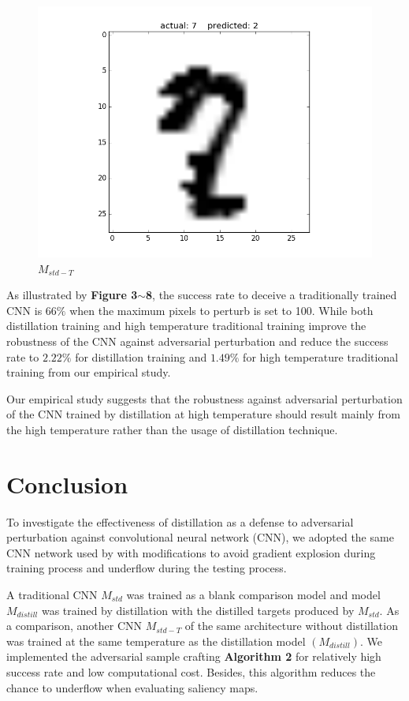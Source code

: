 \documentclass{article}
\begin{document}
\begin{figure}[h!]
\begin{minipage}{0.5\textwidth}
		\includegraphics[width=\textwidth]{T.png}
		\caption{$M_{std-T}$}
	\end{minipage} \hfill
\end{figure}

As illustrated by \textbf{Figure 3$\sim$8}, the success rate to deceive a traditionally trained CNN is $66\%$ when the maximum pixels to perturb is set to 100.
While both distillation training and high temperature traditional training improve the robustness of the CNN against adversarial perturbation and reduce the success rate to $2.22\%$ for distillation training and $1.49\%$ for high temperature traditional training from our empirical study.

Our empirical study suggests that the robustness against adversarial perturbation of the CNN trained by distillation at high temperature should result mainly from the high temperature rather than the usage of distillation technique.

\section{Conclusion}

To investigate the effectiveness of distillation as a defense to adversarial perturbation against convolutional neural network (CNN), we adopted the same CNN network used by \cite{Papernot} with modifications to avoid gradient explosion during training process and underflow during the testing process.

A traditional CNN $M_{std}$ was trained as a blank comparison model and model $M_{distill}$ was trained by distillation with the distilled targets produced by $M_{std}$.
As a comparison, another CNN $M_{std-T}$ of the same architecture without distillation was trained at the same temperature as the distillation model $(M_{distill})$.
We implemented the adversarial sample crafting \textbf{Algorithm 2} for relatively high success rate and low computational cost. Besides, this algorithm reduces the chance to underflow when evaluating saliency maps.
\end{document}
